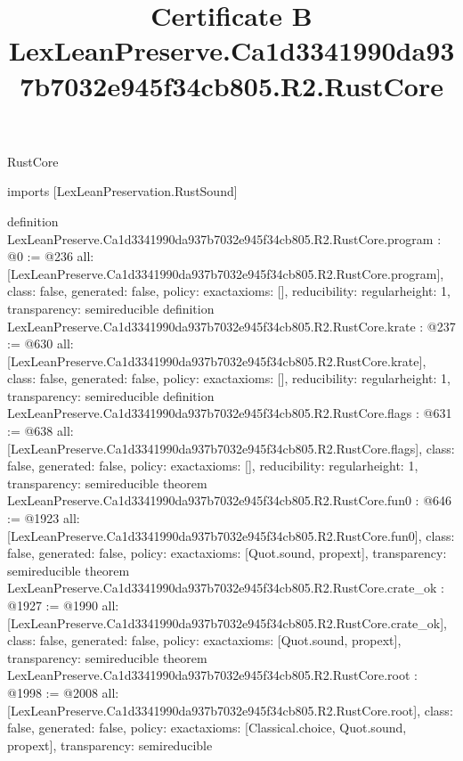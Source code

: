 \begin{lexlean}{RustCore}
\title{Certificate B LexLeanPreserve.Ca1d3341990da937b7032e945f34cb805.R2.RustCore}
\begin{coremodule}
imports [LexLeanPreservation.RustSound]

definition LexLeanPreserve.Ca1d3341990da937b7032e945f34cb805.R2.RustCore.program : @0 := @236 {
  all: [LexLeanPreserve.Ca1d3341990da937b7032e945f34cb805.R2.RustCore.program],
  class: false,
  generated: false,
  policy: exact{axioms: []},
  reducibility: regular{height: 1},
  transparency: semireducible
}
definition LexLeanPreserve.Ca1d3341990da937b7032e945f34cb805.R2.RustCore.krate : @237 := @630 {
  all: [LexLeanPreserve.Ca1d3341990da937b7032e945f34cb805.R2.RustCore.krate],
  class: false,
  generated: false,
  policy: exact{axioms: []},
  reducibility: regular{height: 1},
  transparency: semireducible
}
definition LexLeanPreserve.Ca1d3341990da937b7032e945f34cb805.R2.RustCore.flags : @631 := @638 {
  all: [LexLeanPreserve.Ca1d3341990da937b7032e945f34cb805.R2.RustCore.flags],
  class: false,
  generated: false,
  policy: exact{axioms: []},
  reducibility: regular{height: 1},
  transparency: semireducible
}
theorem LexLeanPreserve.Ca1d3341990da937b7032e945f34cb805.R2.RustCore.fun0 : @646 := @1923 {
  all: [LexLeanPreserve.Ca1d3341990da937b7032e945f34cb805.R2.RustCore.fun0],
  class: false,
  generated: false,
  policy: exact{axioms: [Quot.sound, propext]},
  transparency: semireducible
}
theorem LexLeanPreserve.Ca1d3341990da937b7032e945f34cb805.R2.RustCore.crate_ok : @1927 := @1990 {
  all: [LexLeanPreserve.Ca1d3341990da937b7032e945f34cb805.R2.RustCore.crate_ok],
  class: false,
  generated: false,
  policy: exact{axioms: [Quot.sound, propext]},
  transparency: semireducible
}
theorem LexLeanPreserve.Ca1d3341990da937b7032e945f34cb805.R2.RustCore.root : @1998 := @2008 {
  all: [LexLeanPreserve.Ca1d3341990da937b7032e945f34cb805.R2.RustCore.root],
  class: false,
  generated: false,
  policy: exact{axioms: [Classical.choice, Quot.sound, propext]},
  transparency: semireducible
}


\end{coremodule}
\end{lexlean}
